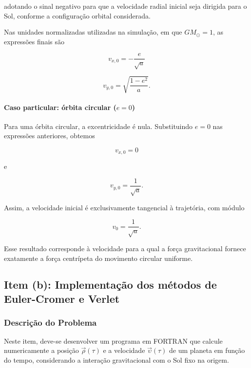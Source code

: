 \documentclass[12pt,a4paper]{article}
\begin{document}
adotando o sinal negativo para que a velocidade radial inicial seja
dirigida para o Sol, conforme a configuração orbital considerada.

Nas unidades normalizadas utilizadas na simulação, em que
$GM_{\odot}=1$, as expressões finais são

\begin{equation}
    \boxed{v_{x,0}=-\frac{e}{\sqrt{a}}}
\end{equation}

\begin{equation}
    \boxed{v_{y,0}=\sqrt{\frac{1-e^2}{a}}}.
\end{equation}

\paragraph{Caso particular: órbita circular ($e=0$)}

Para uma órbita circular, a excentricidade é nula. Substituindo
$e=0$ nas expressões anteriores, obtemos

\begin{equation}
    v_{x,0}=0
\end{equation}

e

\begin{equation}
    v_{y,0}=\frac{1}{\sqrt{a}}.
\end{equation}

Assim, a velocidade inicial é exclusivamente tangencial à trajetória,
com módulo

\begin{equation}
    \boxed{v_0=\frac{1}{\sqrt{a}}}.
\end{equation}

Esse resultado corresponde à velocidade para a qual
a força gravitacional fornece exatamente a força centrípeta do movimento circular uniforme.

\subsection{Item (b): Implementação dos métodos de Euler-Cromer e Verlet}

\subsubsection{Descrição do Problema}

Neste item, deve-se desenvolver um programa em FORTRAN que calcule numericamente a posição $\vec{\rho}(\tau)$ e a velocidade $\vec{\upsilon}(\tau)$ de um planeta em função do tempo, considerando a interação gravitacional com o Sol fixo na origem.
\end{document}
